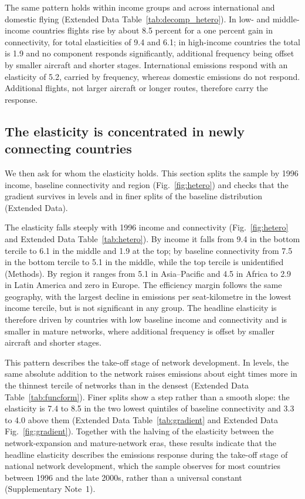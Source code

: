 \documentclass[12pt]{extarticle}
\begin{document}
The same pattern holds within income groups and across international and
domestic flying (Extended Data Table~\ref{tab:decomp_hetero}). In low-
and middle-income countries flights rise by about 8.5 percent for a one
percent gain in connectivity, for total elasticities of 9.4 and 6.1; in
high-income countries the total is 1.9 and no component responds
significantly, additional frequency being offset by smaller aircraft and
shorter stages. International emissions respond with an elasticity of
5.2, carried by frequency, whereas domestic emissions do not respond.
Additional flights, not larger aircraft or longer routes, therefore carry
the response.

\subsection*{The elasticity is concentrated in newly connecting countries}
We then ask for whom the elasticity holds. This section splits the sample
by 1996 income, baseline connectivity and region (Fig.~\ref{fig:hetero})
and checks that the gradient survives in levels and in finer splits of the
baseline distribution (Extended Data).

The elasticity falls steeply with 1996 income and connectivity
(Fig.~\ref{fig:hetero} and Extended Data Table~\ref{tab:hetero}). By
income it falls from 9.4 in the bottom tercile to 6.1 in the middle and
1.9 at the top; by baseline connectivity from 7.5 in the bottom tercile
to 5.1 in the middle, while the top tercile is unidentified (Methods). By
region it ranges from 5.1 in Asia--Pacific and 4.5 in Africa to 2.9 in
Latin America and zero in Europe. The efficiency margin follows the same
geography, with the largest decline in emissions per seat-kilometre in
the lowest income tercile, but is not significant in any group. The
headline elasticity is therefore driven by countries with low baseline
income and connectivity and is smaller in mature networks, where
additional frequency is offset by smaller aircraft and shorter stages.

This pattern describes the take-off stage of network development. In levels, the same absolute addition to the network raises emissions about eight times more in the thinnest tercile of networks than in the densest (Extended Data Table~\ref{tab:funcform}). Finer splits show a step rather than a smooth
slope: the elasticity is 7.4 to 8.5 in the two lowest quintiles of
baseline connectivity and 3.3 to 4.0 above them (Extended Data
Table~\ref{tab:gradient} and Extended Data Fig.~\ref{fig:gradient}).
Together with the halving of the elasticity between the
network-expansion and mature-network eras, these results indicate that
the headline elasticity describes the emissions response during the
take-off stage of national network development, which the sample observes
for most countries between 1996 and the late 2000s, rather than a
universal constant (Supplementary Note~1).
\end{document}
